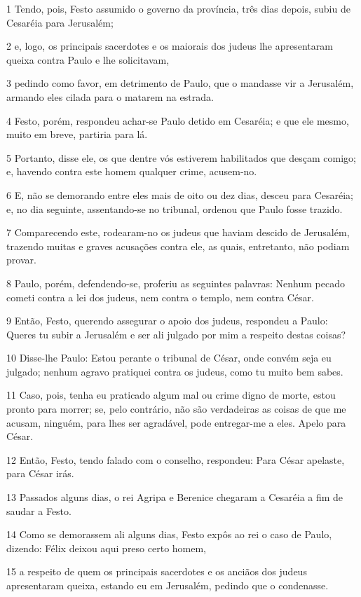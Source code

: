 \par 1 Tendo, pois, Festo assumido o governo da província, três dias depois, subiu de Cesaréia para Jerusalém;
\par 2 e, logo, os principais sacerdotes e os maiorais dos judeus lhe apresentaram queixa contra Paulo e lhe solicitavam,
\par 3 pedindo como favor, em detrimento de Paulo, que o mandasse vir a Jerusalém, armando eles cilada para o matarem na estrada.
\par 4 Festo, porém, respondeu achar-se Paulo detido em Cesaréia; e que ele mesmo, muito em breve, partiria para lá.
\par 5 Portanto, disse ele, os que dentre vós estiverem habilitados que desçam comigo; e, havendo contra este homem qualquer crime, acusem-no.
\par 6 E, não se demorando entre eles mais de oito ou dez dias, desceu para Cesaréia; e, no dia seguinte, assentando-se no tribunal, ordenou que Paulo fosse trazido.
\par 7 Comparecendo este, rodearam-no os judeus que haviam descido de Jerusalém, trazendo muitas e graves acusações contra ele, as quais, entretanto, não podiam provar.
\par 8 Paulo, porém, defendendo-se, proferiu as seguintes palavras: Nenhum pecado cometi contra a lei dos judeus, nem contra o templo, nem contra César.
\par 9 Então, Festo, querendo assegurar o apoio dos judeus, respondeu a Paulo: Queres tu subir a Jerusalém e ser ali julgado por mim a respeito destas coisas?
\par 10 Disse-lhe Paulo: Estou perante o tribunal de César, onde convém seja eu julgado; nenhum agravo pratiquei contra os judeus, como tu muito bem sabes.
\par 11 Caso, pois, tenha eu praticado algum mal ou crime digno de morte, estou pronto para morrer; se, pelo contrário, não são verdadeiras as coisas de que me acusam, ninguém, para lhes ser agradável, pode entregar-me a eles. Apelo para César.
\par 12 Então, Festo, tendo falado com o conselho, respondeu: Para César apelaste, para César irás.
\par 13 Passados alguns dias, o rei Agripa e Berenice chegaram a Cesaréia a fim de saudar a Festo.
\par 14 Como se demorassem ali alguns dias, Festo expôs ao rei o caso de Paulo, dizendo: Félix deixou aqui preso certo homem,
\par 15 a respeito de quem os principais sacerdotes e os anciãos dos judeus apresentaram queixa, estando eu em Jerusalém, pedindo que o condenasse.
